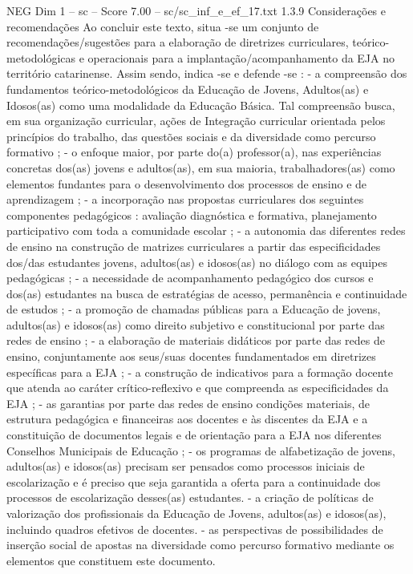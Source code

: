 \begin{textsample}{NEG Dim 1 – sc – Score 7.00 – sc/sc\_inf\_e\_ef\_17.txt}  \label{ex:f1_neg_275}
1.3.9 Considerações e recomendações Ao concluir este texto, situa -se um conjunto de recomendações/sugestões para a elaboração de diretrizes curriculares, teórico-metodológicas e operacionais para a implantação/acompanhamento da EJA no território catarinense.
Assim sendo, indica -se e defende -se : - a compreensão dos fundamentos teórico-metodológicos da Educação de Jovens, Adultos(as) e Idosos(as) como uma modalidade da Educação Básica.
Tal compreensão busca, em sua organização curricular, ações de Integração curricular orientada pelos princípios do trabalho, das questões sociais e da diversidade como percurso formativo ; - o enfoque maior, por parte do(a) professor(a), nas experiências concretas dos(as) jovens e adultos(as), em sua maioria, trabalhadores(as) como elementos fundantes para o desenvolvimento dos processos de ensino e de aprendizagem ; - a incorporação nas propostas curriculares dos seguintes componentes pedagógicos : avaliação diagnóstica e formativa, planejamento participativo com toda a comunidade escolar ; - a autonomia das diferentes redes de ensino na construção de matrizes curriculares a partir das especificidades dos/das estudantes jovens, adultos(as) e idosos(as) no diálogo com as equipes pedagógicas ; - a necessidade de acompanhamento pedagógico dos cursos e dos(as) estudantes na busca de estratégias de acesso, permanência e continuidade de estudos ; - a promoção de chamadas públicas para a Educação de jovens, adultos(as) e idosos(as) como direito subjetivo e constitucional por parte das redes de ensino ; - a elaboração de materiais didáticos por parte das redes de ensino, conjuntamente aos seus/suas docentes fundamentados em diretrizes específicas para a EJA ; - a construção de indicativos para a formação docente que atenda ao caráter crítico-reflexivo e que compreenda as especificidades da EJA ; - as garantias por parte das redes de ensino condições materiais, de estrutura pedagógica e financeiras aos docentes e às discentes da EJA e a constituição de documentos legais e de orientação para a EJA nos diferentes Conselhos Municipais de Educação ; - os programas de alfabetização de jovens, adultos(as) e idosos(as) precisam ser pensados como processos iniciais de escolarização e é preciso que seja garantida a oferta para a continuidade dos processos de escolarização desses(as) estudantes. - a criação de políticas de valorização dos profissionais da Educação de Jovens, adultos(as) e idosos(as), incluindo quadros efetivos de docentes. - as perspectivas de possibilidades de inserção social de apostas na diversidade como percurso formativo mediante os elementos que constituem este documento.

\end{textsample}
